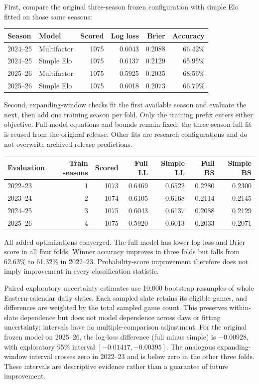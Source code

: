 \documentclass[11pt]{article}
\begin{document}
First, compare the original three-season frozen configuration with simple
Elo fitted on those same seasons:
\begin{center}\small
\begin{tabular}{llrrrr}
\toprule
Season & Model & Scored & Log loss & Brier & Accuracy\\
\midrule
2024--25 & Multifactor & 1075 & 0.6043 & 0.2088 & 66.42\% \\
2024--25 & Simple Elo & 1075 & 0.6137 & 0.2129 & 65.95\% \\
2025--26 & Multifactor & 1075 & 0.5925 & 0.2035 & 68.56\% \\
2025--26 & Simple Elo & 1075 & 0.6018 & 0.2073 & 66.79\% \\
\bottomrule
\end{tabular}\end{center}

Second, expanding-window checks fit the first available season and evaluate
the next, then add one training season per fold. Only the training prefix
enters either objective. Full-model equations and bounds remain fixed; the
three-season full fit is reused from the original release. Other fits are
research configurations and do not overwrite archived release predictions.
\begin{center}\small
\begin{tabular}{lrrrrrr}
\toprule
Evaluation & Train seasons & Scored & Full LL & Simple LL & Full BS & Simple BS\\
\midrule
2022--23 & 1 & 1073 & 0.6469 & 0.6522 & 0.2280 & 0.2300 \\
2023--24 & 2 & 1074 & 0.6105 & 0.6168 & 0.2114 & 0.2145 \\
2024--25 & 3 & 1075 & 0.6043 & 0.6137 & 0.2088 & 0.2129 \\
2025--26 & 4 & 1075 & 0.5920 & 0.6013 & 0.2033 & 0.2071 \\
\bottomrule
\end{tabular}\end{center}
All added optimizations converged. The full model has lower log loss and
Brier score in all four folds. Winner accuracy improves in three folds but
falls from 62.63\% to 61.32\% in 2022--23. Probability-score improvement
therefore does not imply improvement in every classification statistic.

Paired exploratory uncertainty estimates use 10,000 bootstrap resamples of
whole Eastern-calendar daily slates. Each sampled slate retains its eligible
games, and differences are weighted by the total sampled game count. This
preserves within-slate dependence but does not model dependence across days
or fitting uncertainty; intervals have no multiple-comparison adjustment.
For the original frozen model on 2025--26, the log-loss difference (full minus
simple) is $-0.00928$, with exploratory 95\% interval
$[-0.01417,-0.00395]$. The analogous expanding-window interval crosses zero
in 2022--23 and is below zero in the other three folds. These intervals are
descriptive evidence rather than a guarantee of future improvement.
\end{document}
